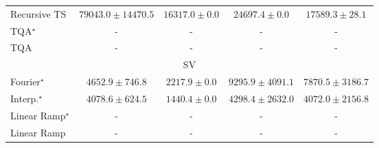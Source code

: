\begin{tabular}{l|cccc|}
Recursive TS & {\cellcolor[HTML]{00472A}} \color[HTML]{F1F1F1} $79043.0\pm 14470.5$ & {\cellcolor[HTML]{FCFED6}} \color[HTML]{000000} $16317.0\pm 0.0$ & {\cellcolor[HTML]{EDF8B1}} \color[HTML]{000000} $24697.4\pm 0.0$ & {\cellcolor[HTML]{FBFDCF}} \color[HTML]{000000} $17589.3\pm 28.1$ \\
TQA$^\star$ & {\cellcolor[HTML]{000000}} \color[HTML]{F1F1F1} {\cellcolor{white}} \color{black} - & {\cellcolor[HTML]{000000}} \color[HTML]{F1F1F1} {\cellcolor{white}} \color{black} - & {\cellcolor[HTML]{000000}} \color[HTML]{F1F1F1} {\cellcolor{white}} \color{black} - & {\cellcolor[HTML]{000000}} \color[HTML]{F1F1F1} {\cellcolor{white}} \color{black} - \\
TQA & {\cellcolor[HTML]{000000}} \color[HTML]{F1F1F1} {\cellcolor{white}} \color{black} - & {\cellcolor[HTML]{000000}} \color[HTML]{F1F1F1} {\cellcolor{white}} \color{black} - & {\cellcolor[HTML]{000000}} \color[HTML]{F1F1F1} {\cellcolor{white}} \color{black} - & {\cellcolor[HTML]{000000}} \color[HTML]{F1F1F1} {\cellcolor{white}} \color{black} - \\
\cline{1-5}
\multicolumn{5}{c}{\rule{0pt}{8pt}SV} \\
\midrule
Fourier$^\star$ & {\cellcolor[HTML]{99B8D8}} \color[HTML]{000000} $4652.9\pm 746.8$ & {\cellcolor[HTML]{F0EAF4}} \color[HTML]{000000} $2217.9\pm 0.0$ & {\cellcolor[HTML]{023858}} \color[HTML]{F1F1F1} $9295.9\pm 4091.1$ & {\cellcolor[HTML]{04649D}} \color[HTML]{F1F1F1} $7870.5\pm 3186.7$ \\
Interp.$^\star$ & {\cellcolor[HTML]{B4C4DF}} \color[HTML]{000000} $4078.6\pm 624.5$ & {\cellcolor[HTML]{FFF7FB}} \color[HTML]{000000} $1440.4\pm 0.0$ & {\cellcolor[HTML]{A9BFDC}} \color[HTML]{000000} $4298.4\pm 2632.0$ & {\cellcolor[HTML]{B4C4DF}} \color[HTML]{000000} $4072.0\pm 2156.8$ \\
Linear Ramp$^\star$ & {\cellcolor[HTML]{000000}} \color[HTML]{F1F1F1} {\cellcolor{white}} \color{black} - & {\cellcolor[HTML]{000000}} \color[HTML]{F1F1F1} {\cellcolor{white}} \color{black} - & {\cellcolor[HTML]{000000}} \color[HTML]{F1F1F1} {\cellcolor{white}} \color{black} - & {\cellcolor[HTML]{000000}} \color[HTML]{F1F1F1} {\cellcolor{white}} \color{black} - \\
Linear Ramp & {\cellcolor[HTML]{000000}} \color[HTML]{F1F1F1} {\cellcolor{white}} \color{black} - & {\cellcolor[HTML]{000000}} \color[HTML]{F1F1F1} {\cellcolor{white}} \color{black} - & {\cellcolor[HTML]{000000}} \color[HTML]{F1F1F1} {\cellcolor{white}} \color{black} - & {\cellcolor[HTML]{000000}} \color[HTML]{F1F1F1} {\cellcolor{white}} \color{black} - \\

\end{tabular}
